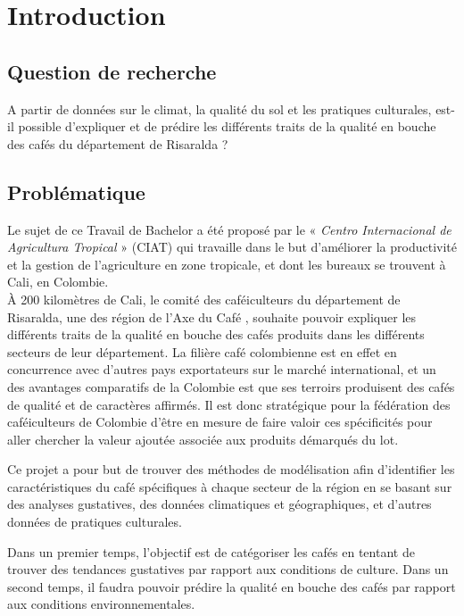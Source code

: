 


\chapter{Introduction}
\section{Question de recherche}

A partir de données sur le climat, la qualité du sol et les pratiques culturales, est-il possible d’expliquer et de prédire les différents traits de la qualité en bouche des cafés du département de Risaralda ?



\section{Problématique}
Le sujet de ce Travail de Bachelor a été proposé par le « \textit{Centro Internacional de Agricultura Tropical }» (CIAT) qui travaille dans le but d’améliorer la productivité et la gestion de l’agriculture en zone tropicale, et dont les bureaux se trouvent à Cali, en Colombie.\\

À 200 kilomètres de Cali, le comité des caféiculteurs du département de Risaralda, une des région de l'Axe du Café \cite{EJE}, souhaite pouvoir expliquer les différents traits de la qualité en bouche des cafés produits dans les différents secteurs de leur département. La filière café colombienne est en effet en concurrence avec d’autres pays exportateurs sur le marché international, et un des avantages comparatifs de la Colombie est que ses terroirs produisent des cafés de qualité et de caractères affirmés. Il est donc stratégique pour la fédération des caféiculteurs de Colombie d'être en mesure de faire valoir ces spécificités pour aller chercher la valeur ajoutée associée aux produits démarqués du lot.


Ce projet a pour but de trouver des méthodes de modélisation afin d’identifier les caractéristiques du café spécifiques à chaque secteur de la région en se basant sur des analyses gustatives, des données climatiques et géographiques, et d’autres données de pratiques culturales.


Dans un premier temps, l’objectif est de catégoriser les cafés en tentant de trouver des tendances gustatives par rapport aux conditions de culture. Dans un second temps, il faudra pouvoir prédire la qualité en bouche des cafés par rapport aux conditions environnementales.


